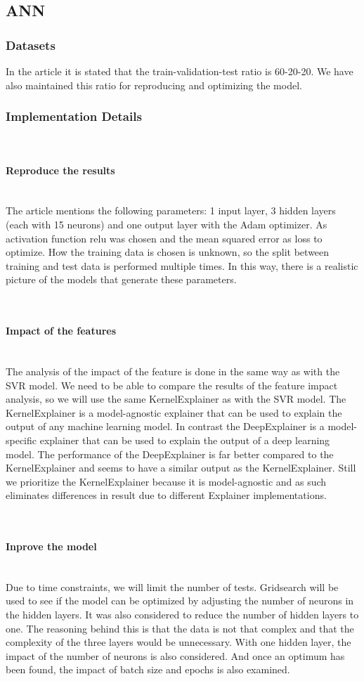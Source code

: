 \documentclass{article}
\newcommand{\subsubsubsection}[1]{%
  \paragraph{#1}\mbox{}\\}
\begin{document}
\subsection{ANN}

\subsubsection{Datasets}
In the article it is stated that the train-validation-test ratio is 60-20-20. We have also maintained this ratio for reproducing and optimizing the model.

\subsubsection{Implementation Details}

\subsubsubsection{Reproduce the results}
The article mentions the following parameters: 1 input layer, 3 hidden layers (each with 15 neurons) and one output layer with the Adam optimizer.
As activation function relu was chosen and the mean squared error as loss to optimize.
How the training data is chosen is unknown, so the split between training and test data is performed multiple times. In this way, there is a realistic picture of the models that generate these parameters.

\subsubsubsection{Impact of the features}
The analysis of the impact of the feature is done in the same way as with the SVR model.
We need to be able to compare the results of the feature impact analysis, so we will use the same KernelExplainer as with the SVR model.
The KernelExplainer is a model-agnostic explainer that can be used to explain the output of any machine learning model.
In contrast the DeepExplainer is a model-specific explainer that can be used to explain the output of a deep learning model.
The performance of the DeepExplainer is far better compared to the KernelExplainer and seems to have a similar output as the KernelExplainer.
Still we prioritize the KernelExplainer because it is model-agnostic and as such eliminates differences in result due to different Explainer implementations.



\subsubsubsection{Inprove the model}
Due to time constraints, we will limit the number of tests. Gridsearch will be used to see if the model can be optimized by adjusting the number of neurons in the hidden layers.
It was also considered to reduce the number of hidden layers to one. The reasoning behind this is that the data is not that complex and that the complexity of the three layers would be unnecessary. With one hidden layer, the impact of the number of neurons is also considered. And once an optimum has been found, the impact of batch size and epochs is also examined.
\end{document}
